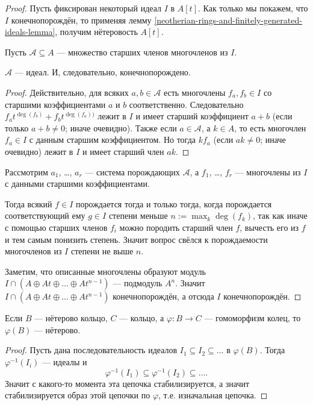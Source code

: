 \documentclass[12pt,a4paper]{article}
\begin{document}
    \begin{proof}
        Пусть фиксирован некоторый идеал $I$ в $A[t]$. Как только мы покажем, что $I$ конечнопорождён, то применяя лемму \ref{neotherian-rings-and-finitely-generated-ideals-lemma}, получим нётеровость $A[t]$.

        Пусть $\mathcal{A} \subseteq A$ --- множество старших членов многочленов из $I$.

        \begin{thlemma}
            $\mathcal{A}$ --- идеал. И, следовательно, конечнопорождено.
        \end{thlemma}

        \begin{proof}
            Действительно, для всяких $a, b \in \mathcal{A}$ есть многочлены $f_a, f_b \in I$ со старшими коэффициентами $a$ и $b$ соответственно. Следовательно $f_a t^{\deg(f_b)} + f_b t^{\deg(f_a))}$ лежит в $I$ и имеет старший коэффициент $a + b$ (если только $a + b \neq 0$; иначе очевидно). Также если $a \in \mathcal{A}$, а $k \in A$, то есть многочлен $f_a \in I$ с данным старшим коэффициентом. Но тогда $k f_a$ (если $ak \neq 0$; иначе очевидно) лежит в $I$ и имеет старший член $a k$.
        \end{proof}

        Рассмотрим $a_1$, \dots, $a_r$ --- система порождающих $\mathcal{A}$, а $f_1$, \dots, $f_r$ --- многочлены из $I$ с данными старшими коэффициентами.

        Тогда всякий $f \in I$ порождается тогда и только тогда, когда порождается соответствующий ему $g \in I$ степени меньше $n := \max_k \deg(f_k)$, так как иначе с помощью старших членов $f_i$ можно породить старший член $f$, вычесть его из $f$ и тем самым понизить степень. Значит вопрос свёлся к порождаемости многочленов из $I$ степени не выше $n$.

        Заметим, что описанные многочлены образуют модуль $I \cap (A \oplus A t \oplus \dots \oplus A t^{n-1})$ --- подмодуль $A^n$. Значит $I \cap (A \oplus A t \oplus \dots \oplus A t^{n-1})$ конечнопорождён, а отсюда $I$ конечнопорождён.
    \end{proof}

    \begin{lemma}
        Если $B$ --- нётерово кольцо, $C$ --- кольцо, а $\varphi: B \to C$ --- гомоморфизм колец, то $\varphi(B)$ --- нётерово.
    \end{lemma}

    \begin{proof}
        Пусть дана последовательность идеалов $I_1 \subseteq I_2 \subseteq \dots$ в $\varphi(B)$. Тогда $\varphi^{-1}(I_i)$ --- идеалы и
        \[\varphi^{-1}(I_1) \subseteq \varphi^{-1}(I_2) \subseteq \dots.\]
        Значит с какого-то момента эта цепочка стабилизируется, а значит стабилизируется образ этой цепочки по $\varphi$, т.е. изначальная цепочка.
    \end{proof}
\end{document}

